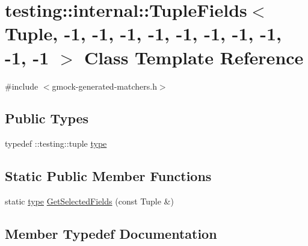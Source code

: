 \hypertarget{classtesting_1_1internal_1_1TupleFields_3_01Tuple_00_01-1_00_01-1_00_01-1_00_01-1_00_01-1_00_01-e023d39d312048e71832a898e9e07f70}{}\section{testing\+::internal\+::Tuple\+Fields$<$ Tuple, -\/1, -\/1, -\/1, -\/1, -\/1, -\/1, -\/1, -\/1, -\/1, -\/1 $>$ Class Template Reference}
\label{classtesting_1_1internal_1_1TupleFields_3_01Tuple_00_01-1_00_01-1_00_01-1_00_01-1_00_01-1_00_01-e023d39d312048e71832a898e9e07f70}


{\ttfamily \#include $<$gmock-\/generated-\/matchers.\+h$>$}

\subsection*{Public Types}
\begin{DoxyCompactItemize}
\item 
typedef \+::testing\+::tuple \mbox{\hyperlink{classtesting_1_1internal_1_1TupleFields_3_01Tuple_00_01-1_00_01-1_00_01-1_00_01-1_00_01-1_00_01-e023d39d312048e71832a898e9e07f70_a853fa65a18c6b392327ae2cf59bc9571}{type}}
\end{DoxyCompactItemize}
\subsection*{Static Public Member Functions}
\begin{DoxyCompactItemize}
\item 
static \mbox{\hyperlink{classtesting_1_1internal_1_1TupleFields_3_01Tuple_00_01-1_00_01-1_00_01-1_00_01-1_00_01-1_00_01-e023d39d312048e71832a898e9e07f70_a853fa65a18c6b392327ae2cf59bc9571}{type}} \mbox{\hyperlink{classtesting_1_1internal_1_1TupleFields_3_01Tuple_00_01-1_00_01-1_00_01-1_00_01-1_00_01-1_00_01-e023d39d312048e71832a898e9e07f70_a50c35eab642d04560d5a412cd10246ce}{Get\+Selected\+Fields}} (const Tuple \&)
\end{DoxyCompactItemize}


\subsection{Member Typedef Documentation}
\mbox{\label{classtesting_1_1internal_1_1TupleFields_3_01Tuple_00_01-1_00_01-1_00_01-1_00_01-1_00_01-1_00_01-e023d39d312048e71832a898e9e07f70_a853fa65a18c6b392327ae2cf59bc9571}} 
